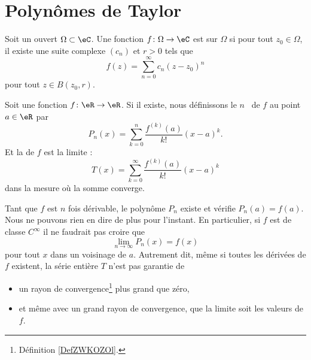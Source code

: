 \section{Polynômes de Taylor}
\label{AppSecTaylorR}

\begin{definition}      \label{DEFooCLGZooRuEkTe}
    Soit un ouvert \( \Omega\subset \eC\). Une fonction \( f\colon \Omega\to \eC\) est  sur \( \Omega\) si pour tout \( z_0\in\Omega\), il existe une suite complexe \( (c_n)\) et \( r>0\) tels que
    \begin{equation}
        f(z)=\sum_{n=0}^{\infty} c_n(z-z_0)^n
    \end{equation}
    pour tout \( z\in B(z_0,r)\).
\end{definition}

\begin{definition}
    Soit une fonction \( f\colon \eR\to \eR\). Si il existe, nous définissons le \( n\)\ieme\  de $f$ au point \( a\in \eR\) par
    \begin{equation}
        P_n(x)=\sum_{k=0}^n\frac{ f^{(k)}(a) }{ k! }(x-a)^k.
    \end{equation}
    Et la  de \( f\) est la limite :
    \begin{equation}
        T(x)=\sum_{k=0}^{\infty}\frac{ f^{(k)}(a) }{ k! }(x-a)^k
    \end{equation}
    dans la mesure où la somme converge.
\end{definition}

Tant que \( f\) est \( n\) fois dérivable, le polynôme \( P_n\) existe et vérifie \( P_n(a)=f(a)\). Nous ne pouvons rien en dire de plus pour l'instant. En particulier, si \( f\) est de classe \(  C^{\infty}\) il ne faudrait pas croire que
\begin{equation}
    \lim_{n\to \infty} P_n(x)=f(x)
\end{equation}
pour tout \( x\) dans un voisinage de \( a\). Autrement dit, même si toutes les dérivées de \( f\) existent, la série entière \( T\) n'est pas garantie de
\begin{itemize}
    \item 
        un rayon de convergence\footnote{Définition \ref{DefZWKOZOl}.} plus grand que zéro,
    \item
        et même avec un grand rayon de convergence, que la limite soit les valeurs de \( f\).
\end{itemize}

